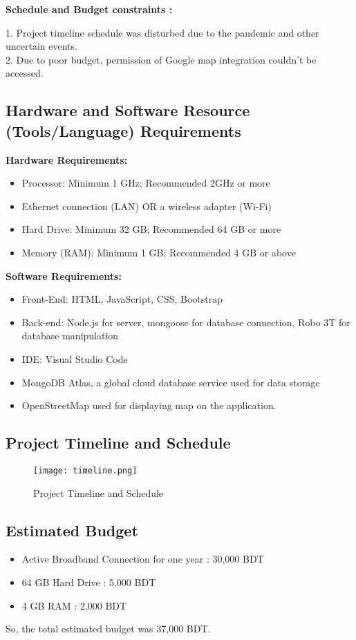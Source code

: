 \documentclass[11pt]{article} %
\begin{document}
	
	\textbf{Schedule and Budget constraints : }

	1. Project timeline schedule was disturbed due to the pandemic and other uncertain events.\\
	2. Due to poor budget, permission of Google map integration couldn't be accessed. 


	\subsection{Hardware and Software Resource (Tools/Language) Requirements}
	\vspace{.5cm}
	\textbf{Hardware Requirements:}
	\begin{itemize}
	\item Processor: Minimum 1 GHz; Recommended 2GHz or more
    \item Ethernet connection (LAN) OR a wireless adapter (Wi-Fi)
    \item Hard Drive: Minimum 32 GB; Recommended 64 GB or more
    \item Memory (RAM): Minimum 1 GB; Recommended 4 GB or above
    \end{itemize}
    \vspace{.5cm}
    \textbf{Software Requirements:}
    \begin{itemize}
        \item Front-End: HTML, JavaScript, CSS, Bootstrap
        \item Back-end: Node.js for server, mongoose for database connection, Robo 3T for database manipulation
        \item IDE: Visual Studio Code
        \item MongoDB Atlas, a global cloud database service used for data storage
        \item OpenStreetMap used for displaying map on the application.
    \end{itemize}
	
	\subsection{Project Timeline and Schedule}
	\begin{figure}[!hbt]
        \texttt{[image: timeline.png]}\par 
        \caption{Project Timeline and Schedule}
        \label{fig:timeline}
    \end{figure}

	\subsection{Estimated Budget}
	\begin{itemize}
	    \item Active Broadband Connection for one year : 30,000 BDT
	    \item 64 GB Hard Drive : 5,000 BDT
	    \item 4 GB RAM : 2,000 BDT
	\end{itemize}
    So, the total estimated budget was 37,000 BDT.
\end{document}
